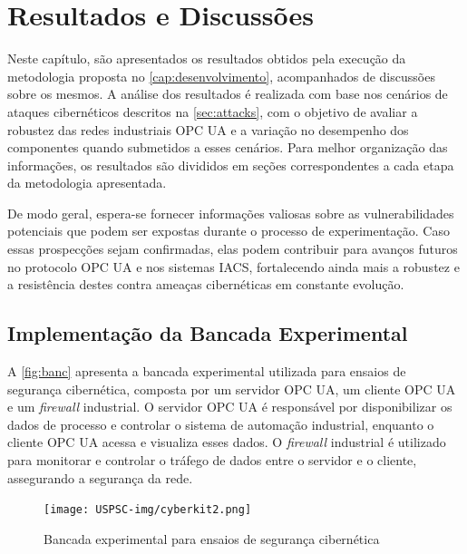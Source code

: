 \chapter{Resultados e Discussões} \label{cap:resultados}

Neste capítulo, são apresentados os resultados obtidos pela execução da metodologia proposta no \autoref{cap:desenvolvimento}, acompanhados de discussões sobre os mesmos. A análise dos resultados é realizada com base nos cenários de ataques cibernéticos descritos na \autoref{sec:attacks}, com o objetivo de avaliar a robustez das redes industriais OPC UA e a variação no desempenho dos componentes quando submetidos a esses cenários. Para melhor organização das informações, os resultados são divididos em seções correspondentes a cada etapa da metodologia apresentada.

De modo geral, espera-se fornecer informações valiosas sobre as vulnerabilidades potenciais que podem ser expostas durante o processo de experimentação. Caso essas prospecções sejam confirmadas, elas podem contribuir para avanços futuros no protocolo OPC UA e nos sistemas IACS, fortalecendo ainda mais a robustez e a resistência destes contra ameaças cibernéticas em constante evolução.

\section{Implementação da Bancada Experimental} \label{sec:impl-bancada}

    A \autoref{fig:banc} apresenta a bancada experimental utilizada para ensaios de segurança cibernética, composta por um servidor OPC UA, um cliente OPC UA e um \textit{firewall} industrial. O servidor OPC UA é responsável por disponibilizar os dados de processo e controlar o sistema de automação industrial, enquanto o cliente OPC UA acessa e visualiza esses dados. O \textit{firewall} industrial é utilizado para monitorar e controlar o tráfego de dados entre o servidor e o cliente, assegurando a segurança da rede.

    \begin{figure}[htbp!]
        \caption{\label{fig:banc}Bancada experimental para ensaios de segurança cibernética}
        \begin{center}
            \texttt{[image: USPSC-img/cyberkit2.png]}
        \end{center}
    \end{figure}

